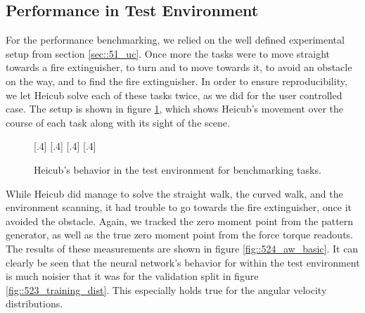 \subsection{Performance in Test Environment}
For the performance benchmarking, we relied on the well defined experimental setup from section \ref{sec::51_uc}. Once more the tasks were to move straight towards a fire extinguisher, to turn and to move towards it, to avoid an obstacle on the way, and to find the fire extinguisher. In order to ensure reproducibility, we let Heicub solve each of these tasks twice, as we did for the user controlled case. The setup is shown in figure \ref{fig::524_aw_gif_basic}, which shows Heicub's movement over the course of each task along with its sight of the scene.
\begin{figure}[h]
	\centering
	[.4\linewidth]{}
	[.4\linewidth]{}
	[.4\linewidth]{}
	[.4\linewidth]{}
	\caption{Heicub's behavior in the test environment for benchmarking tasks.}
	\label{fig::524_aw_gif_basic}
\end{figure} 
While Heicub did manage to solve the straight walk, the curved walk, and the environment scanning, it had trouble to go towards the fire extinguisher, once it avoided the obstacle. Again, we tracked the zero moment point from the pattern generator, as well as the true zero moment point from the force torque readouts. The results of these measurements are shown in figure \ref{fig::524_aw_basic}. It can clearly be seen that the neural network's behavior for within the test environment is much noisier that it was for the validation split in figure \ref{fig::523_training_dist}. This especially holds true for the angular velocity distributions. 

